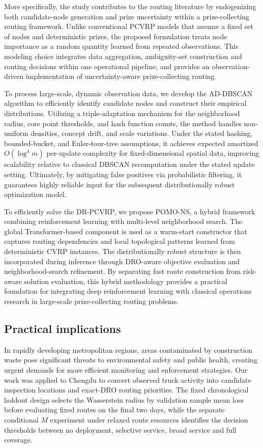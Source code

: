 \documentclass[preprint,12pt,authoryear]{elsarticle}
\theoremstyle{definition}
\begin{document}
More specifically, the study contributes to the routing literature by endogenizing both candidate-node generation and prize uncertainty within a prize-collecting routing framework. 
Unlike conventional PCVRP models that assume a fixed set of nodes and deterministic prizes, the proposed formulation treats node importance as a random quantity learned from repeated observations. 
This modeling choice integrates data aggregation, ambiguity-set construction and routing decisions within one operational pipeline, and provides an observation-driven implementation of uncertainty-aware prize-collecting routing.


To process large-scale, dynamic observation data, we develop the AD-DBSCAN algorithm to efficiently identify candidate nodes and construct their empirical distributions. Utilizing a triple-adaptation mechanism for the neighborhood radius, core point thresholds, and hash function counts, the method handles non-uniform densities, concept drift, and scale variations. Under the stated hashing, bounded-bucket, and Euler-tour-tree assumptions, it achieves expected amortized $O(\log^4 m)$ per-update complexity for fixed-dimensional spatial data, improving scalability relative to classical DBSCAN recomputation under the stated update setting. Ultimately, by mitigating false positives via probabilistic filtering, it guarantees highly reliable input for the subsequent distributionally robust optimization model.

To efficiently solve the DR-PCVRP, we propose POMO-NS, a hybrid framework combining reinforcement learning with multi-level neighborhood search. The global Transformer-based component is used as a warm-start constructor that captures routing dependencies and local topological patterns learned from deterministic CVRP instances. The distributionally robust structure is then incorporated during inference through DRO-aware objective evaluation and neighborhood-search refinement. By separating fast route construction from risk-aware solution evaluation, this hybrid methodology provides a practical foundation for integrating deep reinforcement learning with classical operations research in large-scale prize-collecting routing problems.

\subsection{Practical implications}

In rapidly developing metropolitan regions, areas contaminated by construction waste pose significant threats to environmental safety and public health, creating urgent demands for more efficient monitoring and enforcement strategies. 
Our work was applied to Chengdu to convert observed truck activity into candidate inspection locations and exact-DRO routing priorities. 
The fixed chronological holdout design selects the Wasserstein radius by validation sample mean loss before evaluating fixed routes on the final two days, while the separate conditional $M$ experiment under relaxed route resources identifies the decision thresholds between no deployment, selective service, broad service and full coverage.
\end{document}
